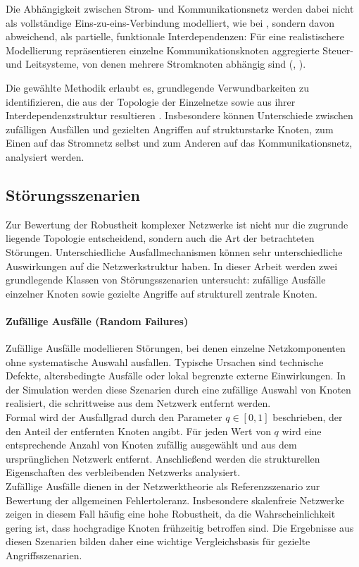 \documentclass[14pt,a4paper]{scrartcl}
\begin{document}
Die Abhängigkeit zwischen Strom- und Kommunikationsnetz werden dabei nicht als vollständige Eins-zu-eins-Verbindung modelliert, wie bei \cite{Buldyrev2010Interdependent}, sondern davon abweichend, als partielle, funktionale Interdependenzen: Für eine realistischere Modellierung repräsentieren einzelne Kommunikationsknoten aggregierte Steuer- und Leitsysteme, von denen mehrere Stromknoten abhängig sind (\cite[vgl.][2]{Parshani2010}, \cite[vgl.][1709]{Yagan2012}). 

Die gewählte Methodik erlaubt es, grundlegende Verwundbarkeiten zu identifizieren, die aus der Topologie der Einzelnetze sowie aus ihrer Interdependenzstruktur resultieren \cite[vgl.][1025]{Buldyrev2010Interdependent}. Insbesondere können Unterschiede zwischen zufälligen Ausfällen und gezielten Angriffen auf strukturstarke Knoten, zum Einen auf das Stromnetz selbst und zum Anderen auf das Kommunikationsnetz, analysiert werden. 

\subsection{Störungsszenarien}

Zur Bewertung der Robustheit komplexer Netzwerke ist nicht
nur die zugrunde liegende Topologie entscheidend, sondern auch die Art der
betrachteten Störungen. Unterschiedliche Ausfallmechanismen können sehr
unterschiedliche Auswirkungen auf die Netzwerkstruktur haben. In dieser Arbeit
werden zwei grundlegende Klassen von Störungsszenarien untersucht: zufällige
Ausfälle einzelner Knoten sowie gezielte Angriffe auf strukturell zentrale
Knoten.

\paragraph{Zufällige Ausfälle (Random Failures)}
Zufällige Ausfälle modellieren Störungen, bei denen einzelne Netzkomponenten
ohne systematische Auswahl ausfallen. Typische Ursachen sind technische
Defekte, altersbedingte Ausfälle oder lokal begrenzte externe Einwirkungen. In
der Simulation werden diese Szenarien durch eine zufällige Auswahl von Knoten
realisiert, die schrittweise aus dem Netzwerk entfernt werden.\\
Formal wird der Ausfallgrad durch den Parameter $q \in [0,1]$ beschrieben, der
den Anteil der entfernten Knoten angibt. Für jeden Wert von $q$ wird eine
entsprechende Anzahl von Knoten zufällig ausgewählt und aus dem ursprünglichen
Netzwerk entfernt. Anschließend werden die strukturellen Eigenschaften des
verbleibenden Netzwerks analysiert.\\
Zufällige Ausfälle dienen in der Netzwerktheorie als Referenzszenario zur
Bewertung der allgemeinen Fehlertoleranz. Insbesondere skalenfreie Netzwerke
zeigen in diesem Fall häufig eine hohe Robustheit, da die Wahrscheinlichkeit
gering ist, dass hochgradige Knoten frühzeitig betroffen sind. Die Ergebnisse aus diesen Szenarien bilden daher eine
wichtige Vergleichsbasis für gezielte Angriffsszenarien.
\end{document}

